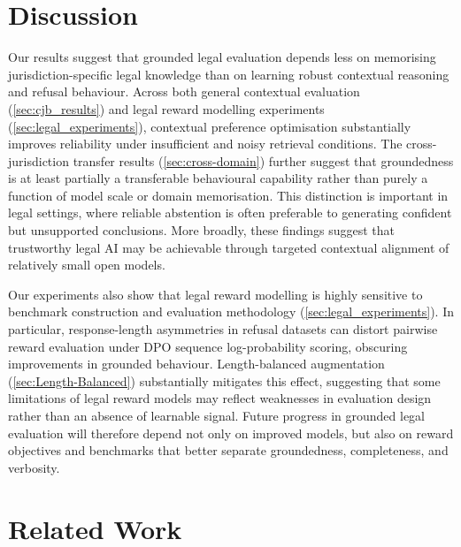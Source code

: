 \documentclass{article}
\theoremstyle{plain}
\theoremstyle{definition}
\theoremstyle{remark}
\begin{document}
\section{Discussion}

Our results suggest that grounded legal evaluation depends less on memorising jurisdiction-specific legal knowledge than on learning robust contextual reasoning and refusal behaviour. Across both general contextual evaluation (\ref{sec:cjb_results}) and legal reward modelling experiments (\ref{sec:legal_experiments}), contextual preference optimisation substantially improves reliability under insufficient and noisy retrieval conditions. The cross-jurisdiction transfer results (\ref{sec:cross-domain}) further suggest that groundedness is at least partially a transferable behavioural capability rather than purely a function of model scale or domain memorisation. This distinction is important in legal settings, where reliable abstention is often preferable to generating confident but unsupported conclusions. More broadly, these findings suggest that trustworthy legal AI may be achievable through targeted contextual alignment of relatively small open models.

Our experiments also show that legal reward modelling is highly sensitive to benchmark construction and evaluation methodology (\ref{sec:legal_experiments}). In particular, response-length asymmetries in refusal datasets can distort pairwise reward evaluation under DPO sequence log-probability scoring, obscuring improvements in grounded behaviour. Length-balanced augmentation (\ref{sec:Length-Balanced}) substantially mitigates this effect, suggesting that some limitations of legal reward models may reflect weaknesses in evaluation design rather than an absence of learnable signal. Future progress in grounded legal evaluation will therefore depend not only on improved models, but also on reward objectives and benchmarks that better separate groundedness, completeness, and verbosity.


\section{Related Work}
\end{document}
